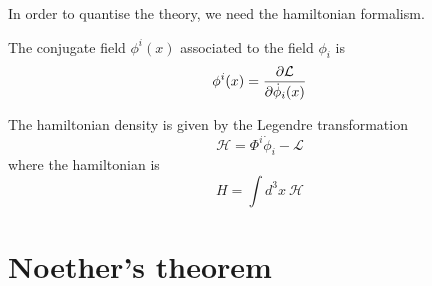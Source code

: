     In order to quantise the theory, we need the hamiltonian formalism.

    \begin{definition}
        The conjugate field $\phi^i(x)$ associated to the field $\phi_i$ is 
        \begin{equation*}
            \phi^i(x) = \frac{\partial\mathcal L}{\partial\dot \phi_i(x)}
        \end{equation*}
    \end{definition}

    The hamiltonian density is given by the Legendre transformation 
    \begin{equation*}
        \mathcal H = \Phi^i \dot \phi_i - \mathcal L
    \end{equation*}
    where the hamiltonian is 
    \begin{equation*}
        H = \int d^3 x ~ \mathcal H
    \end{equation*}

\chapter{Noether's theorem}


